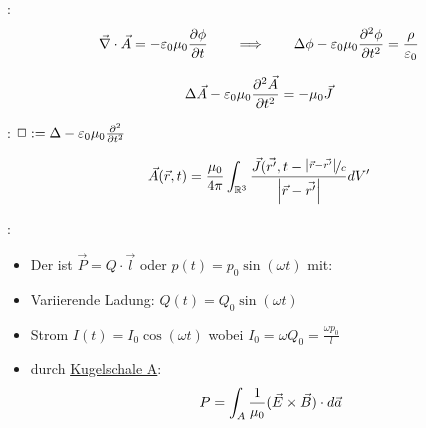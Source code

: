 \vspace{1\baselineskip}

:
\begin{align*}
    \vec{\nabla} \cdot \vec{A} = - \varepsilon_0 \mu_0 \frac{\partial \phi}{\partial t}
    \quad \quad \Longrightarrow \quad \quad
    \Delta \phi - \varepsilon_0 \mu_0 \frac{\partial^2 \phi}{\partial t^2} = \frac{\rho}{\varepsilon_0}
\end{align*}

\vspace{1\baselineskip}

\begin{align*}
    \Delta \vec{A} - \varepsilon_0 \mu_0 \frac{\partial^2 \vec{A}}{\partial t^2} = - \mu_0 \vec{J}
\end{align*}

\vspace{1\baselineskip}

:
$\Box := \Delta - \varepsilon_0 \mu_0 \frac{\partial^2}{\partial t^2}$

\vspace{1\baselineskip}

\begin{align*}
    \vec{A} (\vec{r},t) = \frac{\mu_0}{4 \pi} \int_{\mathbb{R}^3} \frac{\vec{J} (\vec{r'} , t- \nicefrac{\left\vert \vec{r}-\vec{r'} \right\vert}{c}}{\left\vert \vec{r}-\vec{r'} \right\vert} dV'
\end{align*}

\vspace{1\baselineskip}

:
\begin{itemize}
    \item Der  ist $\vec{P} = Q \cdot \vec{l}$ oder $p(t)=p_0 \sin(\omega t)$ mit:
    \item Variierende Ladung: $Q(t) = Q_0 \sin(\omega t)$
    \item Strom $I(t) = I_0 \cos(\omega t)$ wobei $I_0 = \omega Q_0 = \frac{\omega p_0}{l}$

    \pagebreak

    \item {} durch \underline{Kugelschale A}:
            \begin{align*}
                P = \int_A \frac{1}{\mu_0} (\vec{E} \times \vec{B}) \cdot d \vec{a}
            \end{align*}
\end{itemize}
